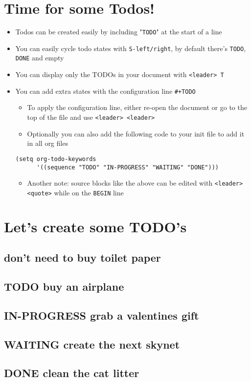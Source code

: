 \documentclass[11pt]{article}
\date{\today}
\title{}
\begin{document}
\tableofcontents

\section{Time for some Todos!}
\label{sec:orgheadline1}
\begin{itemize}
\item Todos can be created easily by including "\texttt{TODO}" at the start of a line
\item You can easily cycle todo states with \texttt{S-left/right}, by default there's \texttt{TODO}, \texttt{DONE} and empty
\item You can display only the TODOs in your document with \texttt{<leader> T}
\item You can add extra states with the configuration line \texttt{\#+TODO}
\begin{itemize}
\item To apply the configuration line, either re-open the document or go to the top of the file and use \texttt{<leader> <leader>}
\item Optionally you can also add the following code to your init file to add it in all org files
\end{itemize}
\begin{verbatim}
(setq org-todo-keywords
      '((sequence "TODO" "IN-PROGRESS" "WAITING" "DONE")))
\end{verbatim}
\begin{itemize}
\item Another note: source blocks like the above can be edited with \texttt{<leader> <quote>} while on the \texttt{BEGIN} line
\end{itemize}
\end{itemize}
\section{Let's create some TODO's}
\label{sec:orgheadline7}
\subsection{don't need to buy toilet paper}
\label{sec:orgheadline2}
\subsection{{\bfseries\sffamily TODO} buy an airplane}
\label{sec:orgheadline3}
\subsection{{\bfseries\sffamily IN-PROGRESS} grab a valentines gift}
\label{sec:orgheadline4}
\subsection{{\bfseries\sffamily WAITING} create the next skynet}
\label{sec:orgheadline5}
\subsection{{\bfseries\sffamily DONE} clean the cat litter}
\label{sec:orgheadline6}
\end{document}
